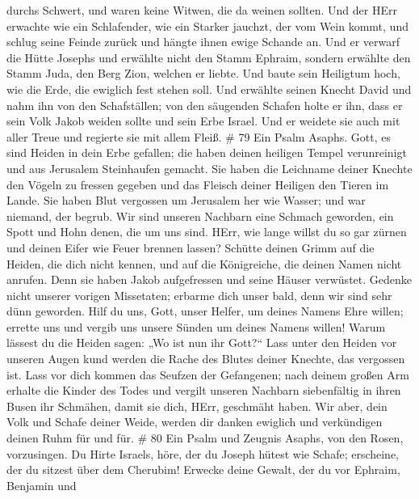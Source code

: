 durchs Schwert, und waren keine Witwen, die da weinen sollten.
 Und der HErr erwachte wie ein Schlafender, wie ein Starker
jauchzt, der vom Wein kommt,  und schlug seine Feinde
zurück und hängte ihnen ewige Schande an.  Und er verwarf
die Hütte Josephs und erwählte nicht den Stamm Ephraim, 
sondern erwählte den Stamm Juda, den Berg Zion, welchen er liebte.
 Und baute sein Heiligtum hoch, wie die Erde, die ewiglich
fest stehen soll.  Und erwählte seinen Knecht David und
nahm ihn von den Schafställen;  von den säugenden Schafen
holte er ihn, dass er sein Volk Jakob weiden sollte und sein Erbe
Israel.  Und er weidete sie auch mit aller Treue und
regierte sie mit allem Fleiß. \# 79  Ein Psalm Asaphs. Gott,
es sind Heiden in dein Erbe gefallen; die haben deinen heiligen Tempel
verunreinigt und aus Jerusalem Steinhaufen gemacht.  Sie
haben die Leichname deiner Knechte den Vögeln zu fressen gegeben und das
Fleisch deiner Heiligen den Tieren im Lande.  Sie haben Blut
vergossen um Jerusalem her wie Wasser; und war niemand, der begrub.
 Wir sind unseren Nachbarn eine Schmach geworden, ein Spott
und Hohn denen, die um uns sind.  HErr, wie lange willst du
so gar zürnen und deinen Eifer wie Feuer brennen lassen? 
Schütte deinen Grimm auf die Heiden, die dich nicht kennen, und auf die
Königreiche, die deinen Namen nicht anrufen.  Denn sie haben
Jakob aufgefressen und seine Häuser verwüstet.  Gedenke
nicht unserer vorigen Missetaten; erbarme dich unser bald, denn wir sind
sehr dünn geworden.  Hilf du uns, Gott, unser Helfer, um
deines Namens Ehre willen; errette uns und vergib uns unsere Sünden um
deines Namens willen!  Warum lässest du die Heiden sagen:
„Wo ist nun ihr Gott?{}`` Lass unter den Heiden vor unseren Augen kund
werden die Rache des Blutes deiner Knechte, das vergossen ist.
 Lass vor dich kommen das Seufzen der Gefangenen; nach
deinem großen Arm erhalte die Kinder des Todes  und vergilt
unseren Nachbarn siebenfältig in ihren Busen ihr Schmähen, damit sie
dich, HErr, geschmäht haben.  Wir aber, dein Volk und
Schafe deiner Weide, werden dir danken ewiglich und verkündigen deinen
Ruhm für und für. \# 80  Ein Psalm und Zeugnis Asaphs, von
den Rosen, vorzusingen.  Du Hirte Israels, höre, der du
Joseph hütest wie Schafe; erscheine, der du sitzest über dem Cherubim!
 Erwecke deine Gewalt, der du vor Ephraim, Benjamin und
